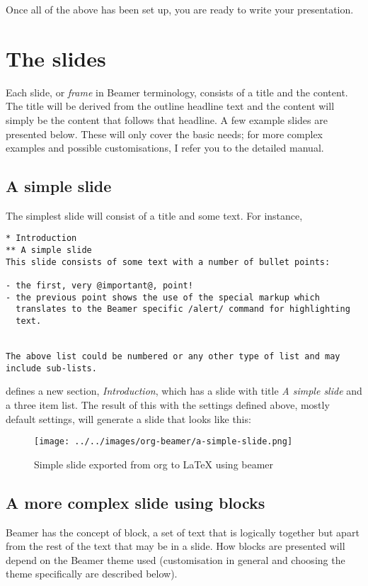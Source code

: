 \documentclass[presentation]{beamer}
\begin{document}
Once all of the above has been set up, you are ready to write your
presentation.

\section{The slides}
\label{sec:org35600e1}

Each slide, or \emph{frame} in Beamer terminology, consists of a title and
the content.  The title will be derived from the outline headline text
and the content will simply be the content that follows that
headline.  A few example slides are presented below.  These will only
cover the basic needs; for more complex examples and possible
customisations, I refer you to the detailed manual.

\subsection{A simple slide}
\label{sec:org2944955}
The simplest slide will consist of a title and some text.  For instance,

\begin{verbatim}
* Introduction
** A simple slide
This slide consists of some text with a number of bullet points:

- the first, very @important@, point!
- the previous point shows the use of the special markup which
  translates to the Beamer specific /alert/ command for highlighting
  text.


The above list could be numbered or any other type of list and may
include sub-lists.
\end{verbatim}

defines a new section, \emph{Introduction}, which has a slide with title
\emph{A simple slide} and a three item list.  The result of this with the
settings defined above, mostly default settings, will generate a slide
that looks like this:

\begin{figure}[htbp]
\centering
\texttt{[image: ../../images/org-beamer/a-simple-slide.png]}
\caption{Simple slide exported from org to \LaTeX{} using beamer}
\end{figure}

\subsection{A more complex slide using blocks}
\label{sec:org8a3463a}

Beamer has the concept of block, a set of text that is logically
together but apart from the rest of the text that may be in a slide.
How blocks are presented will depend on the Beamer theme used
(customisation in general and choosing the theme specifically are
described below).
\end{document}
